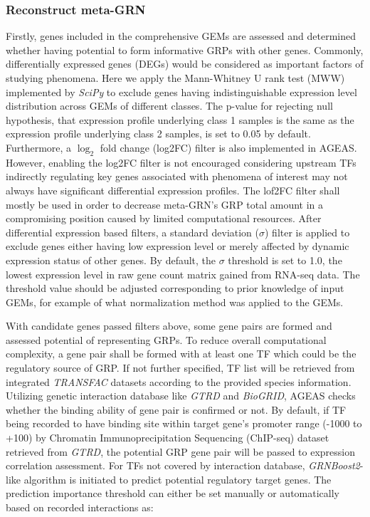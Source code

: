 \documentclass[fleqn,10pt]{wlscirep}
\begin{document}
    \subsubsection*{Reconstruct meta-GRN}
      Firstly, genes included in the comprehensive GEMs are assessed and determined whether having potential to form informative GRPs with other genes.
      Commonly, differentially expressed genes (DEGs) would be considered as important factors of studying  phenomena.
      Here we apply the Mann-Whitney U rank test (MWW) implemented by \emph{SciPy}\cite{2020SciPy-NMeth} to exclude genes having indistinguishable expression level distribution across GEMs of different classes.
      The p-value for rejecting null hypothesis, that expression profile underlying class 1 samples is the same as the expression profile underlying class 2 samples, is set to 0.05 by default.
      Furthermore, a $\log_2$ fold change (log2FC) filter is also implemented in AGEAS.
      However, enabling the log2FC filter is not encouraged considering upstream TFs indirectly regulating key genes associated with phenomena of interest may not always have significant differential expression profiles.
      The lof2FC filter shall mostly be used in order to decrease meta-GRN's GRP total amount in a compromising position caused by limited computational resources.
      After differential expression based filters, a standard deviation ($\sigma$) filter is applied to exclude genes either having low expression level or merely affected by dynamic expression status of other genes.
      By default, the $\sigma$ threshold is set to 1.0, the lowest expression level in raw gene count matrix gained from RNA-seq data.
      The threshold value should be adjusted corresponding to prior knowledge of input GEMs, for example of what normalization method was applied to the GEMs.

      With candidate genes passed filters above, some gene pairs are formed and assessed potential of representing GRPs.
      To reduce overall computational complexity, a gene pair shall be formed with at least one TF which could be the regulatory source of GRP.
      If not further specified, TF list will be retrieved from integrated \emph{TRANSFAC}\cite{transfac} datasets according to the provided species information.
      Utilizing genetic interaction database like \emph{GTRD}\cite{gkaa1057} and \emph{BioGRID}\cite{biogrid}, AGEAS checks whether the binding ability of gene pair is confirmed or not.
      By default, if TF being recorded to have binding site within target gene's promoter range (-1000 to +100) by Chromatin Immunoprecipitation Sequencing (ChIP-seq) dataset retrieved from \emph{GTRD}\cite{gkaa1057}, the potential GRP gene pair will be passed to expression correlation assessment.
      For TFs not covered by interaction database, \emph{GRNBoost2}\cite{grnboost2}-like algorithm is initiated to predict potential regulatory target genes.
      The prediction importance threshold can either be set manually or automatically based on recorded interactions as:
\end{document}
